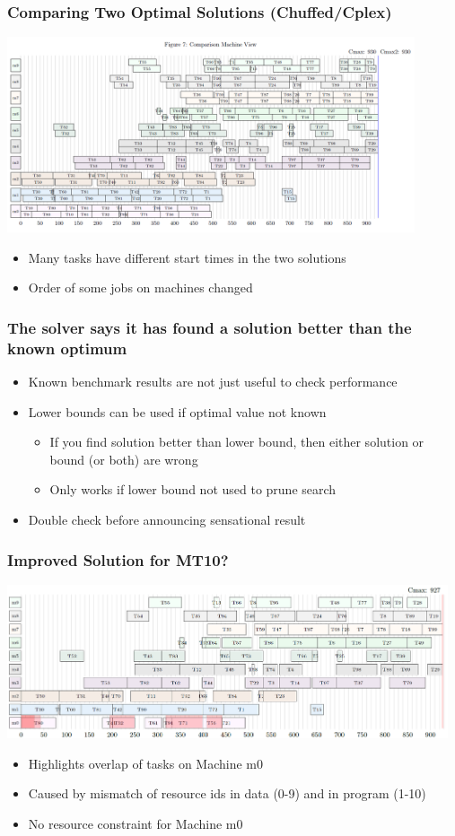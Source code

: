 \begin{frame}[label=mt10compare]
\frametitle{Comparing Two Optimal Solutions (Chuffed/Cplex)}
\includegraphics[width=12cm]{images/mt10machinecomparison.PNG}
\begin{itemize}
    \item Many tasks have different start times in the two solutions
    \item Order of some jobs on machines changed 
\end{itemize}
\end{frame}


\begin{frame}
\frametitle{The solver says it has found a solution better than the known optimum}
\begin{itemize}
\item Known benchmark results are not just useful to check performance
\item Lower bounds can be used if optimal value not known
\begin{itemize}
    \item If you find solution better than lower bound, then either solution or bound (or both) are wrong 
    \item Only works if lower bound not used to prune search
\end{itemize}
\item Double check before announcing sensational result
\end{itemize}
\end{frame}

\begin{frame}
\frametitle{Improved Solution for MT10?}
\includegraphics[width=13cm]{images/mt10taskoverlap.PNG}
\begin{itemize}
    \item Highlights overlap of tasks on Machine m0
    \item Caused by mismatch of resource ids in data (0-9) and in program (1-10)
    \item No resource constraint for Machine m0
\end{itemize}    
\end{frame}

